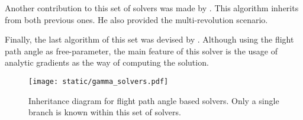 Another contribution to this set of solvers was made by \cite{arlulkar2011}.
This algorithm inherits from both previous ones. He also provided the
multi-revolution scenario.

Finally, the last algorithm of this set was devised by \cite{ahn2013}. Although
using the flight path angle as free-parameter, the main feature of this solver
is the usage of analytic gradients as the way of computing the solution.

\vspace{0.5cm}
\begin{figure}[h]
  \centering
  \texttt{[image: static/gamma\_solvers.pdf]}
  \caption{Inheritance diagram for flight path angle based solvers. Only a
    single branch is known within this set of solvers.}
  \label{fig:regularizing_solvers}
\end{figure}


